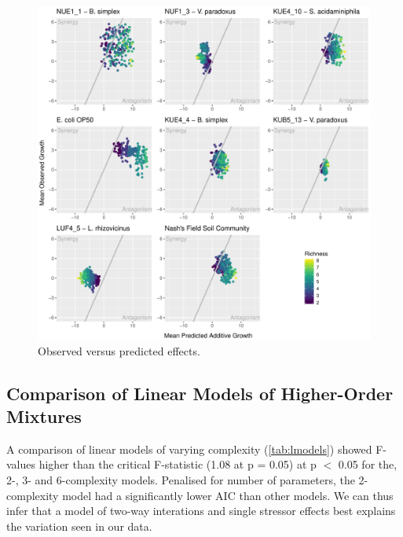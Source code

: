 \documentclass[final,1p,times]{elsarticle}
\begin{document}
\begin{figure}[H]
    \centering
    \includegraphics[width = \textwidth]{Scripts/Results/Final_Pipeline/ObservedXPredicted.pdf}
    \caption{Observed versus predicted effects.}
    \label{fig:obsXpred}
\end{figure}

\newpage
\subsection{Comparison of Linear Models of Higher-Order Mixtures}
\label{S:3:6}

A comparison of linear models of varying complexity (\cref{tab:lmodels}) showed F-values higher than the critical F-statistic (1.08 at p = 0.05) at p $<$ 0.05 for the, 2-, 3- and 6-complexity models. Penalised for number of parameters, the 2-complexity model had a significantly lower AIC than other models. We can thus infer that a model of two-way interations and single stressor effects best explains the variation seen in our data.
\end{document}
